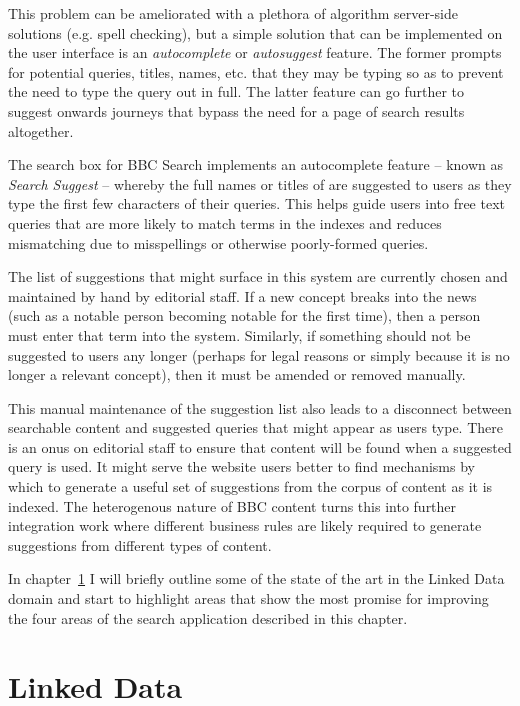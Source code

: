 \documentclass[10pt,a4paper]{report}
\begin{document}
This problem can be ameliorated with a plethora of algorithm
server-side solutions (e.g. spell checking), but a simple solution that
can be implemented on the user interface is an \emph{autocomplete}
or \emph{autosuggest} feature. The former prompts for potential
queries, titles, names, etc. that they may be typing so as to prevent
the need to type the query out in full. The latter feature can go
further to suggest onwards journeys that bypass the need for a
page of search results altogether.

The search box for BBC Search implements an autocomplete
feature -- known
as \emph{Search Suggest} -- whereby
the full names or titles of are suggested to users as they type the first
few characters of their queries. This helps guide users into free text
queries that are more likely to match terms in the indexes and reduces
mismatching due to misspellings or otherwise poorly-formed queries.

The list of suggestions that might surface in this system are
currently chosen and maintained by hand by editorial staff. If a new
concept breaks into the news (such as a notable person becoming notable
for the first time), then a person must enter that term into the system.
Similarly, if something should not be suggested to users any longer
(perhaps for legal reasons or simply because it is no longer a relevant
concept), then it must be amended or removed manually.

This manual maintenance of the suggestion list also leads to a
disconnect between searchable content and suggested queries that might
appear as users type. There is an onus on editorial staff to ensure
that content will be found when a suggested query is used. It might
serve the website users better to find mechanisms by which to generate
a useful set of suggestions from the corpus of content as it is
indexed. The heterogenous nature of BBC content turns this into
further integration work where different business rules are likely required
to generate suggestions from different types of content.

In chapter~\ref{stateoftheart} I will briefly outline some of the state of the
art in the Linked Data domain and start to highlight areas that show
the most promise for improving the four areas of the search application
described in this chapter.


\chapter{Linked Data}
\label{stateoftheart}
\end{document}
